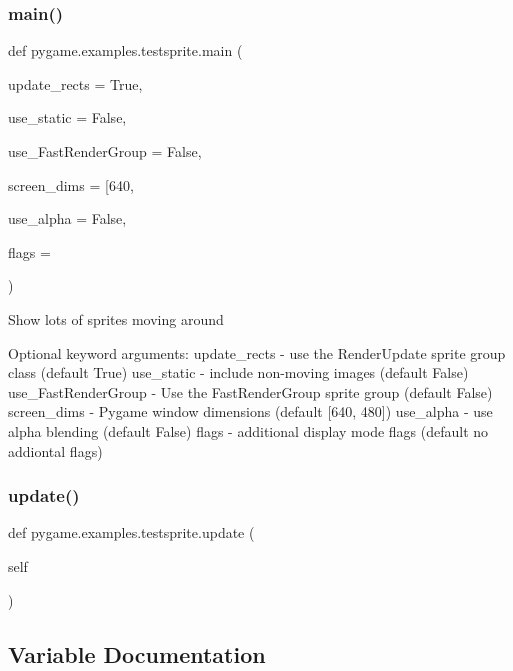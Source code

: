 \subsubsection{\texorpdfstring{main()}{main()}}
{\footnotesize\ttfamily def pygame.\+examples.\+testsprite.\+main (\begin{DoxyParamCaption}\item[{}]{update\+\_\+rects = {\ttfamily True},  }\item[{}]{use\+\_\+static = {\ttfamily False},  }\item[{}]{use\+\_\+\+Fast\+Render\+Group = {\ttfamily False},  }\item[{}]{screen\+\_\+dims = {\ttfamily \mbox{[}640},  }\item[{}]{use\+\_\+alpha = {\ttfamily False},  }\item[{}]{flags = {} }\end{DoxyParamCaption})}

\begin{DoxyVerb}Show lots of sprites moving around

Optional keyword arguments:
update_rects - use the RenderUpdate sprite group class (default True)
use_static - include non-moving images (default False)
use_FastRenderGroup - Use the FastRenderGroup sprite group (default False)
screen_dims - Pygame window dimensions (default [640, 480])
use_alpha - use alpha blending (default False)
flags - additional display mode flags (default no addiontal flags)\end{DoxyVerb}
 \mbox{\label{namespacepygame_1_1examples_1_1testsprite_a6167216b82854360e55a0507e54eabe4}} 
\subsubsection{\texorpdfstring{update()}{update()}}
{\footnotesize\ttfamily def pygame.\+examples.\+testsprite.\+update (\begin{DoxyParamCaption}\item[{}]{self }\end{DoxyParamCaption})}



\subsection{Variable Documentation}
\mbox{\label{namespacepygame_1_1examples_1_1testsprite_a7127c9867e428966f72cc6cd7a1ebe18}} 
